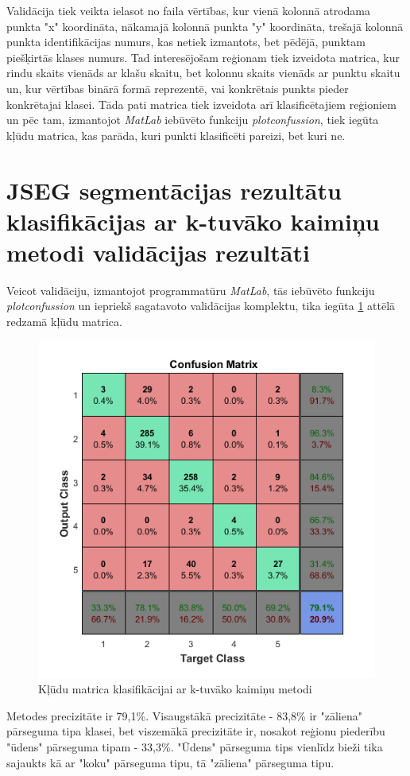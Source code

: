 \documentclass[12pt,paper=a4]{report}
\begin{document}
Validācija tiek veikta ielasot no faila vērtības, kur vienā kolonnā atrodama punkta "x" koordināta, nākamajā kolonnā punkta "y" koordināta, trešajā kolonnā punkta identifikācijas numurs, kas netiek izmantots, bet pēdējā, punktam piešķirtās klases numurs. Tad interesējošam reģionam tiek izveidota matrica, kur rindu skaits vienāds ar klašu skaitu, bet kolonnu skaits vienāds ar punktu skaitu un, kur vērtības binārā formā reprezentē, vai konkrētais punkts pieder konkrētajai klasei. Tāda pati matrica tiek izveidota arī klasificētajiem reģioniem un pēc tam, izmantojot \textit{MatLab} iebūvēto funkciju \textit{plotconfussion}, tiek iegūta kļūdu matrica, kas parāda, kuri punkti klasificēti pareizi, bet kuri ne.
\section{JSEG segmentācijas rezultātu klasifikācijas ar k-tuvāko kaimiņu metodi validācijas rezultāti}Veicot validāciju, izmantojot programmatūru \textit{MatLab}, tās iebūvēto funkciju \textit{plotconfussion} un iepriekš sagatavoto validācijas komplektu, tika iegūta \ref{fig:confMatrix} attēlā redzamā kļūdu matrica. 
\begin{figure}[h!]
\centering
\includegraphics[width=.7\linewidth]{confMatrix}
\caption{Kļūdu matrica klasifikācijai ar k-tuvāko kaimiņu metodi}
\label{fig:confMatrix}
\end{figure}\par
Metodes precizitāte ir 79,1\%. Visaugstākā precizitāte - 83,8\% ir "zāliena" pārseguma tipa klasei, bet viszemākā precizitāte ir, nosakot reģionu piederību "ūdens" pārseguma tipam - 33,3\%. "Ūdens" pārseguma tips vienlīdz bieži tika sajaukts kā ar "koku" pārseguma tipu, tā "zāliena" pārseguma tipu.\par
\end{document}
